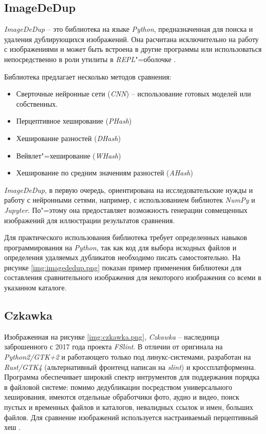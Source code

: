 \subsection{ImageDeDup}
\textit{ImageDeDup} -- это библиотека на языке \textit{Python}, предназначенная
для поиска и удаления дублирующихся изображений. Она расчитана исключительно на
работу с изображениями и может быть встроена в другие программы или
использоваться непосредственно в роли утилиты в \textit{REPL}"=оболочке
\cite{about-imagededup}.

Библиотека предлагает несколько методов сравнения:

\begin{itemize}
    \item Сверточные нейронные сети (\textit{CNN}) -- использование готовых моделей
          или собственных.
    \item Перцептивное хеширование (\textit{PHash})
    \item Хеширование разностей (\textit{DHash})
    \item Вейвлет"=хеширование (\textit{WHash})
    \item Хеширование по средним значениям разностей (\textit{AHash})
\end{itemize}

\textit{ImageDeDup}, в первую очередь, ориентирована на исследовательские нужды
и работу с нейронными сетями, например, с использованием библиотек
\textit{NumPy} и \textit{Jupyter}. По"=этому она предоставляет возможность
генерации совмещенных изображений для иллюстрации результатов сравнения.

Для практического использования библиотека требует определенных навыков
программирования на \textit{Python}, так как код для выбора исходных файлов и
определения удаляемых дубликатов необходимо писать самостоятельно. На рисунке
\ref{img:imagededup.png} показан пример применения библиотеки для составления
сравнительного изображения для некоторого изображения со всеми в указанном
каталоге.


\subsection{Czkawka}
Изображенная на рисунке \ref{img:czkawka.png}, \textit{Czkawka} -- наследница
заброшенного с 2017 года проекта \textit{FSlint}. В отличии от оригинала на
\textit{Python2/GTK+2} и работающего только под линукс-системами, разработан на
\textit{Rust/GTK4} (альтернативный фронтенд написан на \textit{slint}) и
кроссплатформенна. Программа обеспечивает широкий спектр интрументов для
поддержания порядка в файловой системе: помимо дедубликации посредством
универсального хеширования, имеются отдельные обработчики фото, аудио и видео,
поиск пустых и временных файлов и каталогов, невалидных ссылок и имен, больших
файлов. Для сравнение изображений используется настраиваемый перцептивный хеш
\cite{about-czkawka}.

